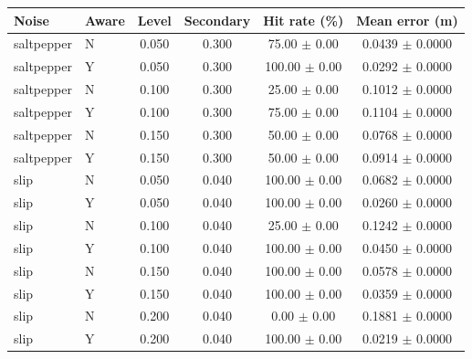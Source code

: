 \begin{tabular}{llcccc}
\hline
Noise & Aware & Level & Secondary & Hit rate (\%) & Mean error (m) \\
\hline
saltpepper & N & 0.050 & 0.300 & 75.00 $\pm$ 0.00 & 0.0439 $\pm$ 0.0000 \\
saltpepper & Y & 0.050 & 0.300 & 100.00 $\pm$ 0.00 & 0.0292 $\pm$ 0.0000 \\
saltpepper & N & 0.100 & 0.300 & 25.00 $\pm$ 0.00 & 0.1012 $\pm$ 0.0000 \\
saltpepper & Y & 0.100 & 0.300 & 75.00 $\pm$ 0.00 & 0.1104 $\pm$ 0.0000 \\
saltpepper & N & 0.150 & 0.300 & 50.00 $\pm$ 0.00 & 0.0768 $\pm$ 0.0000 \\
saltpepper & Y & 0.150 & 0.300 & 50.00 $\pm$ 0.00 & 0.0914 $\pm$ 0.0000 \\
slip & N & 0.050 & 0.040 & 100.00 $\pm$ 0.00 & 0.0682 $\pm$ 0.0000 \\
slip & Y & 0.050 & 0.040 & 100.00 $\pm$ 0.00 & 0.0260 $\pm$ 0.0000 \\
slip & N & 0.100 & 0.040 & 25.00 $\pm$ 0.00 & 0.1242 $\pm$ 0.0000 \\
slip & Y & 0.100 & 0.040 & 100.00 $\pm$ 0.00 & 0.0450 $\pm$ 0.0000 \\
slip & N & 0.150 & 0.040 & 100.00 $\pm$ 0.00 & 0.0578 $\pm$ 0.0000 \\
slip & Y & 0.150 & 0.040 & 100.00 $\pm$ 0.00 & 0.0359 $\pm$ 0.0000 \\
slip & N & 0.200 & 0.040 & 0.00 $\pm$ 0.00 & 0.1881 $\pm$ 0.0000 \\
slip & Y & 0.200 & 0.040 & 100.00 $\pm$ 0.00 & 0.0219 $\pm$ 0.0000 \\
\hline
\end{tabular}
